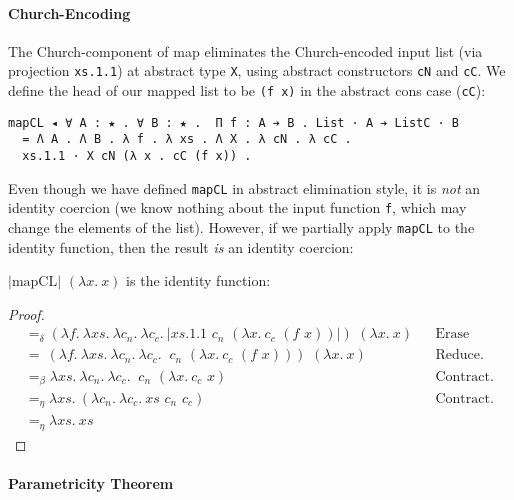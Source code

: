 \documentclass[a4paper,envcountsame,envcountsect]{llncs}
\newcommand{\eqed}[0]{\tag*{\qed}}
\newcommand{\lablem}[1]{\label{lem:#1}}
\newcommand{\earg}[1]{\,\,#1}
\newcommand{\erase}[1]{\ensuremath{\lvert #1 \rvert}}
\newcommand{\fun}[1]{\lambda #1 .~}
\newcommand{\by}[1]{\text{#1}}
\newcommand{\name}[1]{\textrm{#1}}
\begin{document}
\paragraph{Church-Encoding}

The Church-component of map eliminates the Church-encoded input list
(via projection \texttt{xs.1.1}) at abstract type \texttt{X}, using
abstract constructors \texttt{cN} and \texttt{cC}. We define the head
of our mapped list to be \texttt{(f x)} in
the abstract cons case (\texttt{cC}):

\begin{verbatim}
mapCL ◂ ∀ A : ★ . ∀ B : ★ .  Π f : A ➔ B . List · A ➔ ListC · B
  = Λ A . Λ B . λ f . λ xs . Λ X . λ cN . λ cC . 
  xs.1.1 · X cN (λ x . cC (f x)) .
\end{verbatim}

Even though we have defined \texttt{mapCL} in abstract elimination
style, it is \textit{not} an identity coercion (we know nothing about
the input function \texttt{f}, which may change the elements of the
list). However, if we partially apply \texttt{mapCL} to the identity
function, then the result \textit{is} an identity coercion:

\begin{lemma}
$\erase{\name{mapCL}} \earg (\fun{x}{x})$ is the identity function:
\lablem{mapcl}
\end{lemma}

\begin{proof}
{\small
\begin{align*}
  &=_\delta (\fun{f} \fun{xs} \fun{c_n} \fun{c_c} \erase{
    xs.1.1 \earg c_n \earg (\fun{x} c_c \earg (f \earg x))
  }) \earg (\fun{x}{x})
  && \by{Erase projection.}
  \\
  &=~ (\fun{f} \fun{xs} \fun{c_n} \fun{c_c}
    \earg c_n \earg (\fun{x} c_c \earg (f \earg x))
  ) \earg (\fun{x}{x})
  && \by{Reduce.}
  \\
  &=_\beta \fun{xs} \fun{c_n} \fun{c_c}
    \earg c_n \earg (\fun{x} c_c \earg x)
  && \by{Contract.}
  \\
  &=_\eta \fun{xs} (\fun{c_n} \fun{c_c}
    xs \earg c_n \earg c_c)
  && \by{Contract.}
  \\
  &=_\eta \fun{xs}{xs}
  \eqed
\end{align*}}
\end{proof}

\paragraph{Parametricity Theorem}
\end{document}
